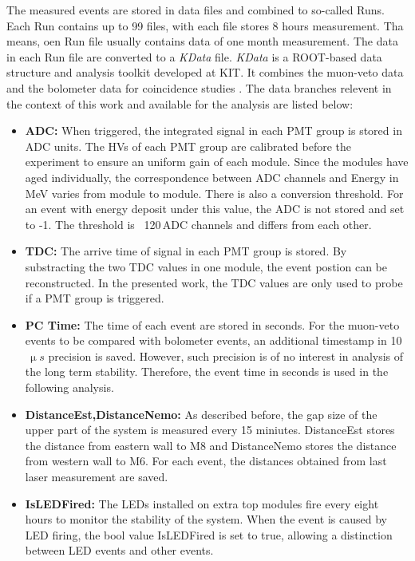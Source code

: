 The measured events are stored in data files and combined to so-called Runs. Each Run contains up to 99 files, with each file stores 8 hours measurement. Tha means, oen Run file usually contains data of one month measurement. The data in each Run file are converted to a \textit{KData} file. \textit{KData} is a ROOT-based \cite{Bru97} data structure and analysis toolkit developed at KIT. It combines the muon-veto data and the bolometer data for coincidence studies \cite{Cox12}.
The data branches relevent in the context of this work and available for the analysis are listed below:
\begin{itemize}
  \item \textbf{ADC: }
  When triggered, the integrated signal in each PMT group is stored in ADC units. The HVs of each PMT group are calibrated before the experiment to ensure an uniform gain of each module. Since the modules have aged individually, the correspondence between ADC channels and Energy in MeV varies from module to module. There is also a conversion threshold. For an event with energy deposit under this value, the ADC is not stored and set to -1. The threshold is ~120\,ADC channels and differs from each other.

  \item \textbf{TDC: }
  The arrive time of signal in each PMT group is stored. By substracting the two TDC values in one module, the event postion can be reconstructed. In the presented work, the TDC values are only used to probe if a PMT group is triggered.


  \item \textbf{PC Time: }
  The time of each event are stored in seconds. For the muon-veto events to be compared with bolometer events, an additional timestamp in 10$\,\si{\upmu s}$ precision is saved. However, such precision is of no interest in analysis of the long term stability. Therefore, the event time in seconds is used in the following analysis.

  \item \textbf{DistanceEst,DistanceNemo:}
  As described before, the gap size of the upper part of the system is measured every 15 miniutes. DistanceEst stores the distance from eastern wall to M8 and DistanceNemo stores the distance from western wall to M6. For each event, the distances obtained from last laser measurement are saved.

  \item \textbf{IsLEDFired: }
  The LEDs installed on extra top modules fire every eight hours to monitor the stability of the system. When the event is caused by LED firing, the bool value IsLEDFired is set to true, allowing a distinction between LED events and other events.
\end{itemize}



